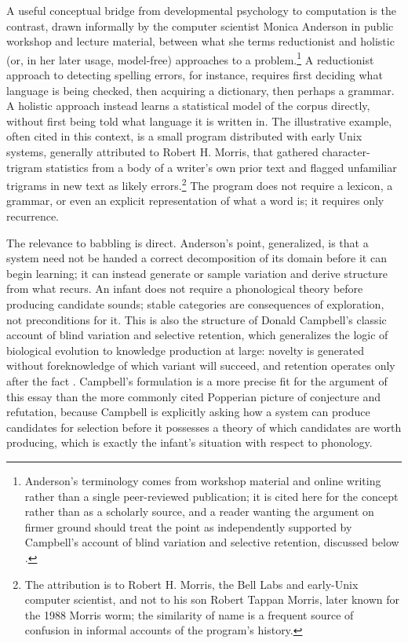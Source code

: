 \documentclass[11pt]{article}
\begin{document}
A useful conceptual bridge from developmental psychology to computation is the contrast, drawn informally by the computer scientist Monica Anderson in public workshop and lecture material, between what she terms reductionist and holistic (or, in her later usage, model-free) approaches to a problem.\footnote{Anderson's terminology comes from workshop material and online writing rather than a single peer-reviewed publication; it is cited here for the concept rather than as a scholarly source, and a reader wanting the argument on firmer ground should treat the point as independently supported by Campbell's account of blind variation and selective retention, discussed below \citep{campbell1960}.} A reductionist approach to detecting spelling errors, for instance, requires first deciding what language is being checked, then acquiring a dictionary, then perhaps a grammar. A holistic approach instead learns a statistical model of the corpus directly, without first being told what language it is written in. The illustrative example, often cited in this context, is a small program distributed with early Unix systems, generally attributed to Robert H. Morris, that gathered character-trigram statistics from a body of a writer's own prior text and flagged unfamiliar trigrams in new text as likely errors.\footnote{The attribution is to Robert H. Morris, the Bell Labs and early-Unix computer scientist, and not to his son Robert Tappan Morris, later known for the 1988 Morris worm; the similarity of name is a frequent source of confusion in informal accounts of the program's history.} The program does not require a lexicon, a grammar, or even an explicit representation of what a word is; it requires only recurrence.

The relevance to babbling is direct. Anderson's point, generalized, is that a system need not be handed a correct decomposition of its domain before it can begin learning; it can instead generate or sample variation and derive structure from what recurs. An infant does not require a phonological theory before producing candidate sounds; stable categories are consequences of exploration, not preconditions for it. This is also the structure of Donald Campbell's classic account of blind variation and selective retention, which generalizes the logic of biological evolution to knowledge production at large: novelty is generated without foreknowledge of which variant will succeed, and retention operates only after the fact \citep{campbell1960}. Campbell's formulation is a more precise fit for the argument of this essay than the more commonly cited Popperian picture of conjecture and refutation, because Campbell is explicitly asking how a system can produce candidates for selection before it possesses a theory of which candidates are worth producing, which is exactly the infant's situation with respect to phonology.
\end{document}
